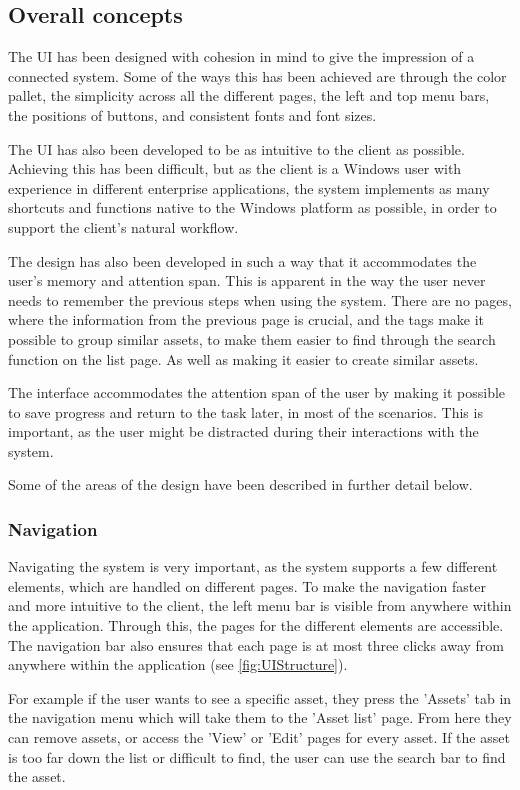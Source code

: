 \subsection{Overall concepts}
The UI has been designed with cohesion in mind to give the impression of a connected system. Some of the ways this has been achieved are through the color pallet, the simplicity across all the different pages, the left and top menu bars, the positions of buttons, and consistent fonts and font sizes.
\par
The UI has also been developed to be as intuitive to the client as possible. Achieving this has been difficult, but as the client is a Windows user with experience in different enterprise applications, the system implements as many shortcuts and functions native to the Windows platform as possible, in order to support the client's natural workflow.
\par
The design has also been developed in such a way that it accommodates the user's memory and attention span. This is apparent in the way the user never needs to remember the previous steps when using the system. There are no pages, where the information from the previous page is crucial, and the tags make it possible to group similar assets, to make them easier to find through the search function on the list page. As well as making it easier to create similar assets.
\par
The interface accommodates the attention span of the user by making it possible to save progress and return to the task later, in most of the scenarios. This is important, as the user might be distracted during their interactions with the system.
\par
Some of the areas of the design have been described in further detail below.

\subsubsection*{Navigation}
Navigating the system is very important, as the system supports a few different elements, which are handled on different pages. To make the navigation faster and more intuitive to the client, the left menu bar is visible from anywhere within the application. Through this, the pages for the different elements are accessible. The navigation bar also ensures that each page is at most three clicks away from anywhere within the application (see \autoref{fig:UIStructure}).
\par
For example if the user wants to see a specific asset, they press the 'Assets' tab in the navigation menu which will take them to the 'Asset list' page. From here they can remove assets, or access the 'View' or 'Edit' pages for every asset. If the asset is too far down the list or difficult to find, the user can use the search bar to find the asset.

